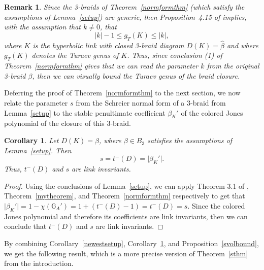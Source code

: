\documentclass{article}
\newtheorem{remark}{Remark}[section]
\newtheorem{corollary}{Corollary}[section]
\begin{document}

\begin{remark}
Since the 3-braids of Theorem~\ref{normformthm} (which satisfy the assumptions of Lemma~\ref{setup}) are generic, then Proposition~4.15 of \cite{Width} implies, with the assumption that $k \neq 0$, that $$\left|k\right|-1 \leq g_{T}(K) \leq \left|k\right|,$$ where $K$ is the hyperbolic link with closed 3-braid diagram $D(K)=\widehat{\beta}$ and where $g_{T}(K)$ denotes the Turaev genus of $K$. Thus, since conclusion (1) of Theorem~\ref{normformthm} gives that we can read the parameter $k$ from the original 3-braid $\beta$, then we can visually bound the Turaev genus of the braid closure.   
\end{remark}

Deferring the proof of Theorem~\ref{normformthm} to the next section, we now relate the parameter $s$ from the Schreier normal form of a 3-braid from Lemma~\ref{setup} to the stable penultimate coefficient $\beta_{K}'$ of the colored Jones polynomial of the closure of this 3-braid. 

\begin{corollary}\label{scor}
Let $D(K)=\widehat{\beta}$, where $\beta \in B_{3}$ satisfies the assumptions of Lemma~\ref{setup}. Then
$$s=t^{-}(D)=\vert\beta_{K}'\vert.$$ 
Thus, $t^{-}(D)$ and $s$ are link invariants. 
\end{corollary} 

\begin{proof} Using the conclusions of Lemma~\ref{setup}, we can apply Theorem 3.1 of \cite{HeadTail}, Theorem~\ref{mytheorem}, and Theorem~\ref{normformthm} respectively to get that $\vert\beta_{K}'\vert = 1-\chi(\mathbb{G}_{A}') = 1+(t^{-}(D)-1) = t^{-}(D) = s$. Since the colored Jones polynomial and therefore its coefficients are link invariants, then we can conclude that $t^{-}(D)$ and $s$ are link invariants.
\end{proof}

By combining Corollary~\ref{newestsetup}, Corollary~\ref{scor}, and Proposition~\ref{svolbound}, we get the following result, which is a more precise version of Theorem~\ref{sthm} from the introduction.  
\end{document}
